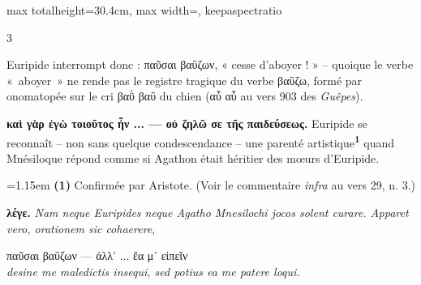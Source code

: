 \documentclass[11pt,twoside]{book}
\newcommand{\italique}[1]{\textit{#1}}
\newcommand{\citComm}[1]{\begin{quoting}[vskip=0.4pt,leftmargin=0.7em,rightmargin=0.2em]#1\end{quoting}}
\newcommand{\grec}[1]{{\policeGr #1}}
\newcommand{\latin}[1]{\textit{#1}}
\newcommand{\marqueur}[1]{\textsuperscript{\color{rubricRed}\textbf{#1}}}
\begin{document}
\begin{adjustbox}{max totalheight=30.4cm, max width=\textwidth, keepaspectratio}
\begin{minipage}{\textwidth}
{\begin{multicols}{3}
\par\vspace{1.5pt}
\noindent Euripide interrompt donc : παῦσαι βαΰζων, « cesse d'aboyer ! » -- quoique le verbe «~aboyer~» ne rende pas le registre tragique du verbe βαΰζω, formé par onomatopée sur le cri βαῢ βαΰ du chien (αὗ αὗ au vers 903 des \italique{Guêpes}).
\par\vspace{1.5pt}
 \textbf{καὶ γὰρ ἐγὼ τοιοῦτος ἦν ... — οὐ ζηλῶ σε τῆς παιδεύσεως.} Euripide se reconnaît – non sans quelque condescendance – une parenté artistique\marqueur{1} quand Mnésiloque répond comme si Agathon était héritier des mœurs d'Euripide.
\par\vspace{1.5pt}
\par\vspace{1.2pt}\par\nopagebreak\vspace{1pt}\noindent\hangindent=1.15em {\color{sepiaNote}\textbf{(1)}} Confirmée par Aristote. (Voir le commentaire \italique{infra} au vers 29, n. 3.)
\par\vspace{1.5pt}
 \textbf{λέγε.} \latin{Nam neque Euripides neque Agatho Mnesilochi jocos solent curare. 
Apparet vero, orationem sic cohaerere},
\citComm{\grec{παῦσαι βαΰζων — άλλ' ... ἔα μ᾽ εἰπεῖν}\\
\latin{desine me maledictis insequi, sed potius ea me patere loqui.}}
\par\end{multicols}}
\end{minipage}\end{adjustbox}
\newpage
\end{document}
